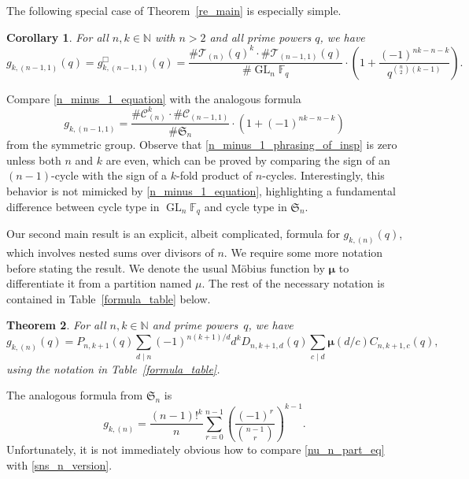 \documentclass[10pt]{article}
\newtheorem{theorem}{Theorem}[section]
\newtheorem{corollary}[theorem]{Corollary}
\theoremstyle{definition}
\DeclareMathOperator{\GL}{GL}
\newcommand{\CC}{\mathcal{C}}
\newcommand{\F}{\mathbb{F}}
\newcommand{\N}{\mathbb{N}}
\newcommand{\FS}{\mathfrak{S}}
\newcommand{\CT}{\mathcal{T}}
\newcommand{\moebius}{\pmb{\mu}}
\begin{document}
The following special case of Theorem~\ref{re_main} is especially simple.
\begin{corollary}
\label{n_minus_1_corollary}
For all \(n,k \in \N\) with \(n > 2\) and all prime powers \(q\), we have
\begin{equation}
\label{n_minus_1_equation}
g_{k,(n-1,1)} (q)
=
g^\Box_{k,(n-1,1)} (q)
=
\frac{\# \CT_{(n)} (q)^k
\cdot
\# \CT_{(n-1,1)} (q)}{\# \GL_n \F_q}
\cdot
\left (
1 + \frac{(-1)^{nk-n-k}}{q^{\binom{n}{2}(k-1)}}
\right ).
\end{equation}
\end{corollary}

Compare \eqref{n_minus_1_equation}
with the analogous formula
\begin{equation}
\label{n_minus_1_phrasing_of_insp}
g_{k,(n-1,1)}
=
\frac{\# \CC_{(n)}^k
\cdot
\# \CC_{(n-1,1)}}{\# \FS_n}
\cdot
\left (
1 + (-1)^{nk-n-k}
\right )
\end{equation}
from the symmetric group.
Observe that \eqref{n_minus_1_phrasing_of_insp} is zero unless both \(n\) and \(k\) are even, which can be proved by comparing the sign of an \((n-1)\)-cycle with the sign of a \(k\)-fold product of \(n\)-cycles.
Interestingly, this behavior is not mimicked by \eqref{n_minus_1_equation}, highlighting a fundamental difference between cycle type in \(\GL_n \F_q\) and cycle type in \(\FS_n\).

Our second main result is an explicit, albeit complicated, formula for \(g_{k,(n)} (q)\), which involves nested sums over divisors of \(n\).
We require some more notation before stating the result.
We denote the usual M\"obius function by \(\moebius\) to differentiate it from a partition named \(\mu\).
The rest of the necessary notation is contained in Table~\ref{formula_table} below.




\begin{theorem}
\label{nu_n_part}
For all \(n, k \in \N\) and prime powers~\(q\),
we have
\begin{equation}
\label{nu_n_part_eq}
g_{k,(n)}(q) = P_{n,k+1} (q)
\sum_{d \mid n}
(-1)^{n(k+1)/d}
d^{k}
D_{n,k+1,d} (q)
\sum_{c \mid d}
\moebius(d/c)
C_{n,k+1,c} (q),
\end{equation}
using the notation in Table~\ref{formula_table}.
\end{theorem}


The analogous formula from \(\FS_n\) is
\begin{equation}
\label{sns_n_version}
g_{k,(n)}
=
\frac{(n-1)!^{k}}{n}
\sum_{r=0}^{n-1}
\left (
\frac{(-1)^r}{\binom{n-1}{r}}
\right )^{k-1}.
\end{equation}
Unfortunately, it is not immediately obvious how to compare \eqref{nu_n_part_eq} with \eqref{sns_n_version}.
\end{document}
